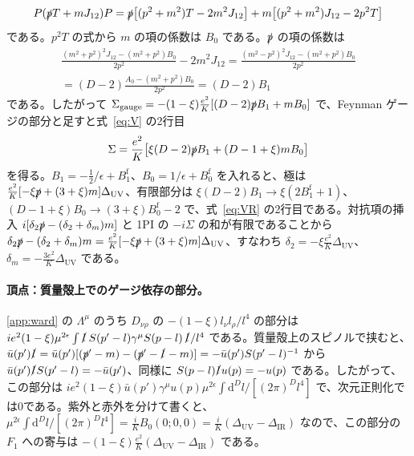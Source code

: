 \documentclass[a4paper,10pt]{ltjsarticle}
\newcommand{\dd}{\mathrm{d}}
\newcommand{\DUV}{\Delta_{\mathrm{UV}}}
\newcommand{\DIR}{\Delta_{\mathrm{IR}}}
\begin{document}
\begin{equation*}
P(\slashed pT+mJ_{12})P=\slashed p\bigl[(p^2+m^2)T-2m^2J_{12}\bigr]+m\bigl[(p^2+m^2)J_{12}-2p^2T\bigr]
\end{equation*}
である。$p^2T$ の式から $m$ の項の係数は $B_0$ である。$\slashed p$ の項の係数は
\begin{equation*}
\begin{gathered}
\frac{(m^2+p^2)^2J_{12}-(m^2+p^2)B_0}{2p^2}-2m^2J_{12}=\frac{(m^2-p^2)^2J_{12}-(m^2+p^2)B_0}{2p^2}
\\=(D-2)\frac{A_0-(m^2+p^2)B_0}{2p^2}=(D-2)B_1
\end{gathered}
\end{equation*}
である。したがって $\Sigma_{\mathrm{gauge}}=-(1-\xi)\frac{e^2}{K}[(D-2)\slashed pB_1+mB_0]$ で、Feynman ゲージの部分と足すと式~\eqref{eq:V} の2行目
\begin{equation*}
\Sigma=\frac{e^2}{K}\bigl[\xi(D-2)\slashed pB_1+(D-1+\xi)mB_0\bigr]
\end{equation*}
を得る。$B_1=-\frac12/\epsilon+B_1^{\mathrm f}$、$B_0=1/\epsilon+B_0^{\mathrm f}$ を入れると、極は $\frac{e^2}{K}[-\xi\slashed p+(3+\xi)m]\DUV$、有限部分は $\xi(D-2)B_1\to\xi(2B_1^{\mathrm f}+1)$、$(D-1+\xi)B_0\to(3+\xi)B_0^{\mathrm f}-2$ で、式~\eqref{eq:VR} の2行目である。対抗項の挿入 $i[\delta_2\slashed p-(\delta_2+\delta_m)m]$ と 1PI の $-i\Sigma$ の和が有限であることから $\delta_2\slashed p-(\delta_2+\delta_m)m=\frac{e^2}{K}[-\xi\slashed p+(3+\xi)m]\DUV$、すなわち $\delta_2=-\xi\frac{e^2}{K}\DUV$、$\delta_m=-\frac{3e^2}{K}\DUV$ である。

\paragraph{頂点：質量殻上でのゲージ依存の部分。}\ref{app:ward} の $\Lambda^\mu$ のうち $D_{\nu\rho}$ の $-(1-\xi)l_\nu l_\rho/l^4$ の部分は $ie^2(1-\xi)\mu^{2\epsilon}\int\slashed l\,S(p'-l)\gamma^\mu S(p-l)\,\slashed l/l^4$ である。質量殻上のスピノルで挟むと、$\bar u(p')\slashed l=\bar u(p')[(\slashed p'-m)-(\slashed p'-\slashed l-m)]=-\bar u(p')S(p'-l)^{-1}$ から $\bar u(p')\slashed lS(p'-l)=-\bar u(p')$、同様に $S(p-l)\slashed lu(p)=-u(p)$ である。したがって、この部分は $ie^2(1-\xi)\bar u(p')\gamma^\mu u(p)\mu^{2\epsilon}\int\dd^Dl/[(2\pi)^Dl^4]$ で、次元正則化では0である。紫外と赤外を分けて書くと、$\mu^{2\epsilon}\int\dd^Dl/[(2\pi)^Dl^4]=\frac iKB_0(0;0,0)=\frac iK(\DUV-\DIR)$ なので、この部分の $F_1$ への寄与は $-(1-\xi)\frac{e^2}{K}(\DUV-\DIR)$ である。
\end{document}
